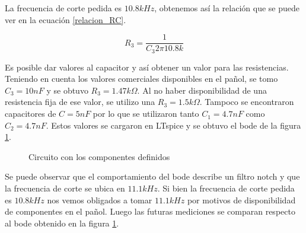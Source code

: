 \documentclass[12pt,a4paper]{article}
\begin{document}
La frecuencia de corte pedida es $10.8k Hz$, obtenemos así la relación que se puede ver en la ecuación \ref{relacion_RC}.

\begin{equation} R_{3} = \frac{1}{C_{3} 2\pi 10.8k} \label{relacion_RC}\end{equation}

Es posible dar valores al capacitor y así obtener un valor para las resistencias. Teniendo en cuenta los valores comerciales disponibles en el pañol, se tomo $C_{3} = 10nF$ y se obtuvo $R_{3}=1.47k\Omega$. Al no haber disponibilidad de una resistencia fija de ese valor, se utilizo una $R_{3}=1.5k\Omega$. Tampoco se encontraron capacitores de $C = 5nF$ por lo que se utilizaron tanto $C_{1} = 4.7nF$ como  $C_{2} = 4.7nF$. Estos valores se cargaron en LTspice y se obtuvo el bode de la figura \ref{fig:bode_ltspice_teorico}.


\begin{figure}[H] 
\begin{center}
\caption{Circuito con los componentes definidos}
\label{fig:bode_ltspice_teorico}
\end{center}
\end{figure}

Se puede observar que el comportamiento del bode describe un filtro notch y que la frecuencia de corte se ubica en $11.1kHz$. Si
bien la frecuencia de corte pedida es $10.8kHz$ nos vemos obligados a tomar $11.1kHz$ por motivos de disponibilidad de componentes
en el pañol. Luego las futuras mediciones se comparan respecto al bode obtenido en la figura \ref{fig:bode_ltspice_teorico}. \\
\end{document}

